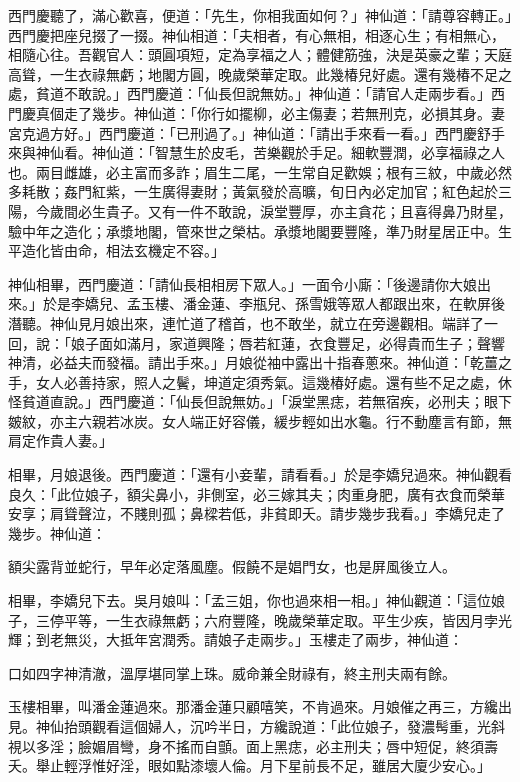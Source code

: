\begin{showcontents}{}
西門慶聽了，滿心歡喜，便道：「先生，你相我面如何？」神仙道：「請尊容轉正。」西門慶把座兒掇了一掇。神仙相道：「夫相者，有心無相，相逐心生；有相無心，相隨心往。吾觀官人：頭圓項短，定為享福之人；體健筋強，決是英豪之輩；天庭高聳，一生衣祿無虧；地閣方圓，晚歲榮華定取。此幾椿兒好處。還有幾椿不足之處，貧道不敢說。」西門慶道：「仙長但說無妨。」神仙道：「請官人走兩步看。」西門慶真個走了幾步。神仙道：「你行如擺柳，必主傷妻；若無刑克，必損其身。妻宮克過方好。」西門慶道：「已刑過了。」神仙道：「請出手來看一看。」西門慶舒手來與神仙看。神仙道：「智慧生於皮毛，苦樂觀於手足。細軟豐潤，必享福祿之人也。兩目雌雄，必主富而多詐；眉生二尾，一生常自足歡娛；根有三紋，中歲必然多耗散；姦門紅紫，一生廣得妻財；黃氣發於高曠，旬日內必定加官；紅色起於三陽，今歲間必生貴子。又有一件不敢說，淚堂豐厚，亦主貪花；且喜得鼻乃財星，驗中年之造化；承漿地閣，管來世之榮枯。承漿地閣要豐隆，準乃財星居正中。生平造化皆由命，相法玄機定不容。」

神仙相畢，西門慶道：「請仙長相相房下眾人。」一面令小廝：「後邊請你大娘出來。」於是李嬌兒、孟玉樓、潘金蓮、李瓶兒、孫雪娥等眾人都跟出來，在軟屏後潛聽。神仙見月娘出來，連忙道了稽首，也不敢坐，就立在旁邊觀相。端詳了一回，說：「娘子面如滿月，家道興隆；唇若紅蓮，衣食豐足，必得貴而生子；聲響神清，必益夫而發福。請出手來。」月娘從袖中露出十指春蔥來。神仙道：「乾薑之手，女人必善持家，照人之鬢，坤道定須秀氣。這幾椿好處。還有些不足之處，休怪貧道直說。」西門慶道：「仙長但說無妨。」「淚堂黑痣，若無宿疾，必刑夫；眼下皴紋，亦主六親若冰炭。女人端正好容儀，緩步輕如出水龜。行不動塵言有節，無肩定作貴人妻。」

相畢，月娘退後。西門慶道：「還有小妾輩，請看看。」於是李嬌兒過來。神仙觀看良久：「此位娘子，額尖鼻小，非側室，必三嫁其夫；肉重身肥，廣有衣食而榮華安享；肩聳聲泣，不賤則孤；鼻樑若低，非貧即夭。請步幾步我看。」李嬌兒走了幾步。神仙道：

額尖露背並蛇行，早年必定落風塵。假饒不是娼門女，也是屏風後立人。

相畢，李嬌兒下去。吳月娘叫：「孟三姐，你也過來相一相。」神仙觀道：「這位娘子，三停平等，一生衣祿無虧；六府豐隆，晚歲榮華定取。平生少疾，皆因月孛光輝；到老無災，大抵年宮潤秀。請娘子走兩步。」玉樓走了兩步，神仙道：

口如四字神清澈，溫厚堪同掌上珠。威命兼全財祿有，終主刑夫兩有餘。

玉樓相畢，叫潘金蓮過來。那潘金蓮只顧嘻笑，不肯過來。月娘催之再三，方纔出見。神仙抬頭觀看這個婦人，沉吟半日，方纔說道：「此位娘子，發濃髩重，光斜視以多淫；臉媚眉彎，身不搖而自顫。面上黑痣，必主刑夫；唇中短促，終須壽夭。舉止輕浮惟好淫，眼如點漆壞人倫。月下星前長不足，雖居大廈少安心。」


\end{showcontents}
